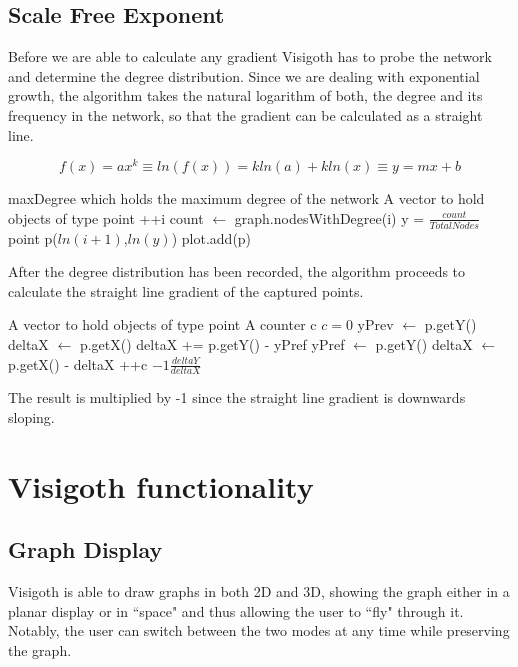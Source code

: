 \documentclass[a4paper,11pt,titlepage]{article}
\let\stdsection\section         %
\renewcommand{\section}{\newpage\stdsection}
\begin{document}
\subsection{Scale Free Exponent}

Before we are able to calculate any gradient Visigoth has to probe the network
and determine the degree distribution. Since we are dealing with exponential
growth, the algorithm takes the natural logarithm of both, the degree and its
frequency in the network, so that the gradient can be calculated as a straight
line.

\[
f(x) = ax^k \equiv ln(f(x)) = kln(a) + kln(x) \equiv y = mx + b
\]

\begin{algorithmic}
\REQUIRE maxDegree which holds the maximum degree of the network
\REQUIRE A vector to hold objects of type point
	\STATE ++i
	\STATE count $\gets$ graph.nodesWithDegree(i)
	\STATE y = $\frac{count}{Total Nodes}$
		\STATE  point p($ln(i+1)$,$ln(y)$)
		\STATE plot.add(p)
	\ENDIF
\ENDFOR
\end{algorithmic}

After the degree distribution has been recorded, the algorithm proceeds to
calculate the straight line gradient of the captured points.

\begin{algorithmic}
\REQUIRE A vector to hold objects of type point
\REQUIRE A counter c
\STATE $c = 0$
		\STATE yPrev $\gets$ p.getY()
		\STATE  deltaX $\gets$ p.getX()
	\ELSE
		\STATE deltaX += p.getY() - yPref
		\STATE yPref $\gets$ p.getY()
		\STATE deltaX $\gets$ p.getX() - deltaX
	\ENDIF
		\STATE ++c
\ENDFOR
\RETURN $-1\frac{deltaY}{deltaX}$
\end{algorithmic}

The result is multiplied by -1 since the straight line gradient is downwards
sloping.



\section{Visigoth functionality}


\subsection{Graph Display}
Visigoth is able to draw graphs in both 2D and 3D, showing the graph either
 in a planar display or in ``space" and thus allowing the user to ``fly" through it. 
Notably, the user can switch between the two modes at any time while preserving 
the graph.
\end{document}
